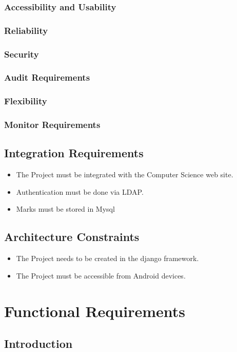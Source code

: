 \documentclass[12pt,a4paper]{article}
\begin{document}
\subsubsection{Accessibility and Usability}
\subsubsection{Reliability}
\subsubsection{Security}
\subsubsection{Audit Requirements}
\subsubsection{Flexibility}
\subsubsection{Monitor Requirements}
\subsection{Integration Requirements}
\begin{itemize}
\item The Project must be integrated with the Computer Science web site.
\item Authentication must be done via LDAP.
\item Marks must be stored in Mysql
\end{itemize}
\subsection{Architecture Constraints}
\begin{itemize}
\item The Project needs to be created in the django framework.
\item The Project must be accessible from Android devices.
\end{itemize}
\section{Functional Requirements}
\subsection{Introduction}
\end{document}
